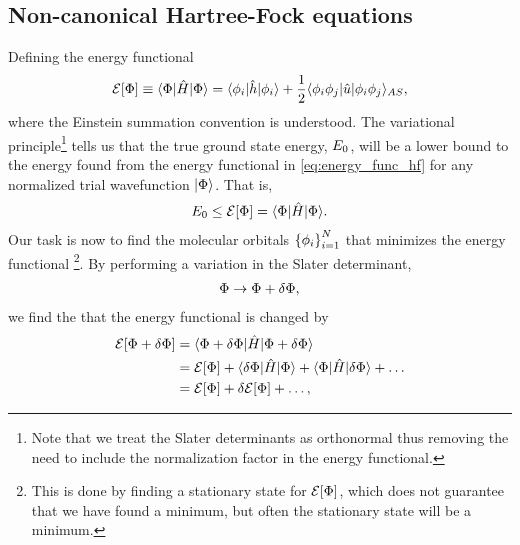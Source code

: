         \subsection{Non-canonical Hartree-Fock equations}
            Defining the energy functional
            \begin{align}
                \mathcal{E}[\Phi]
                \equiv \langle \Phi |\hat{H}| \Phi \rangle
                =
                \langle \phi_i |\hat{h}| \phi_i \rangle
                + \frac{1}{2}\langle \phi_i\phi_j |\hat{u}| \phi_i\phi_j \rangle_{AS},
                \label{eq:energy_func_hf}
            \end{align}
            where the Einstein summation convention is understood.
            The variational principle\footnote{%
                Note that we treat the Slater determinants as orthonormal thus
                removing the need to include the normalization factor in the energy
                functional.
            }
            tells us that the true ground state energy, $E_0$, will be a lower
            bound to the energy found from the energy functional in
            \autoref{eq:energy_func_hf} for any normalized trial wavefunction
            $| \Phi \rangle$.
            That is,
            \begin{align}
                E_0
                \leq \mathcal{E}[\Phi] = \langle \Phi |\hat{H}| \Phi \rangle.
            \end{align}
            Our task is now to find the molecular orbitals $\left\{ \phi_i \right\}_{i =
            1}^{N}$ that minimizes the energy functional%
            \footnote{%
                This is done by finding a stationary state for $\mathcal{E}[\Phi]$,
                which does not guarantee that we have found a minimum, but often the
                stationary state will be a minimum.
            }.
            By performing a variation in the Slater determinant,
            \begin{align}
                \Phi \to \Phi + \delta\Phi,
            \end{align}
            we find the that the energy functional is changed by
            \begin{align}
                \mathcal{E}[\Phi + \delta\Phi]
                &=
                \langle \Phi + \delta\Phi |\hat{H}| \Phi + \delta\Phi \rangle
                \\
                &= \mathcal{E}[\Phi]
                + \langle \delta\Phi |\hat{H}| \Phi \rangle + \langle \Phi |\hat{H}| \delta\Phi \rangle
                + \dots
                \\
                &= \mathcal{E}[\Phi] + \delta\mathcal{E}[\Phi]
                + \dots,
            \end{align}
